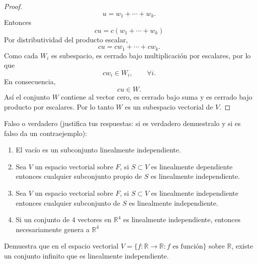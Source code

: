 \documentclass[12pt,a4paper]{article}
\begin{document}
\begin{proof}
        \begin{equation*}
            u=w_{1}+\cdots+w_{k}.
        \end{equation*}
        Entonces
        \begin{equation*}
            cu=c(w_{1}+\cdots+w_{k})
        \end{equation*}
        Por distributividad del producto escalar,
        \begin{equation*}
            cu=cw_{1}+\cdots+cw_{k}.
        \end{equation*}
        Como cada $W_{i}$ es subespacio, es cerrado bajo multiplicación por escalares, por lo que
        \begin{equation*}
            cw_{i}\in W_{i},\qquad \forall i.
        \end{equation*}
        En consecuencia,
        \begin{equation*}
            cu\in W.
        \end{equation*}
        Así el conjunto $W$ contiene al vector cero, es cerrado bajo suma y es cerrado bajo
        producto por escalares. Por lo tanto $W$ es un subespacio vectorial de $V$.
    \end{proof}

    \begin{mdframed}[style=mdbluebox,frametitle={EJercicio 2}]
        Falso o verdadero (justifica tus respuestas: si es verdadero
        demuestralo y si es falso da un contraejemplo):
        \begin{enumerate}
            \item[(a)] El vacío es un subconjunto linealmente independiente.
            \item[(b)] Sea $V$ un espacio vectorial sobre $F$, si $S\subset V$
            es linealmente dependiente entonces cualquier subconjunto propio
            de $S$ es linealmente independiente.
            \item[(c)] Sea $V$ un espacio vectorial sobre $F$, si $S\subset V$
            es linealmente independiente entonces cualquier subconjunto
            de $S$ es linealmente independiente.
            \item[(d)] Si un conjunto de 4 vectores en $\mathbb{R}^{4}$ es
            linealmente independiente, entonces necesariamente genera a $\mathbb{R}^{4}$
        \end{enumerate}
    \end{mdframed}

    \begin{mdframed}[style=mdbluebox,frametitle={Ejercicio 3}]
        Demuestra que en el espacio vectorial $V=\{f:\mathbb{R}\to\mathbb{R}:f\text{ es función}\}$
        sobre $\mathbb{R}$, existe un conjunto infinito que es linealmente independiente.
    \end{mdframed}
\end{document}

